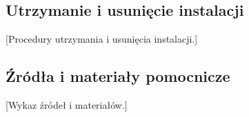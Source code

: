 \documentclass[11pt,a4paper,oneside]{article}
\newif\ifpodpowiedzi
\newcommand{\podpowiedz}[1]{\ifpodpowiedzi\par\begingroup\small\color{hintcolor}\textit{Wskazówka: #1}\par\endgroup\fi}
\newcommand{\pole}[1]{\textnormal{[#1]}}
\begin{document}
\subsection{Utrzymanie i usunięcie instalacji}
\podpowiedz{Jeśli dotyczy: opisz kopie zapasowe i odtwarzanie danych, aktualizację projektu, powrót do poprzedniej wersji i usunięcie instalacji. Wskaż, które pliki lub dane należy zachować oraz które czynności mogą spowodować ich utratę. Dostosuj zakres do projektu; nie twórz procedur dla funkcji, których rozwiązanie nie ma.}
\pole{Procedury utrzymania i usunięcia instalacji.}

\subsection{Źródła i materiały pomocnicze}
\podpowiedz{Wskaż wykorzystane instrukcje producentów, dokumentację narzędzi oraz przekazane pliki pomocnicze, np. przykładową konfigurację i skrypty instalacyjne. Podaj nazwy i lokalizacje plików; dla źródeł internetowych - tytuł, adres i datę dostępu. Usuń podsekcję, jeśli nie ma takich materiałów.}
\pole{Wykaz źródeł i materiałów.}
\end{document}
